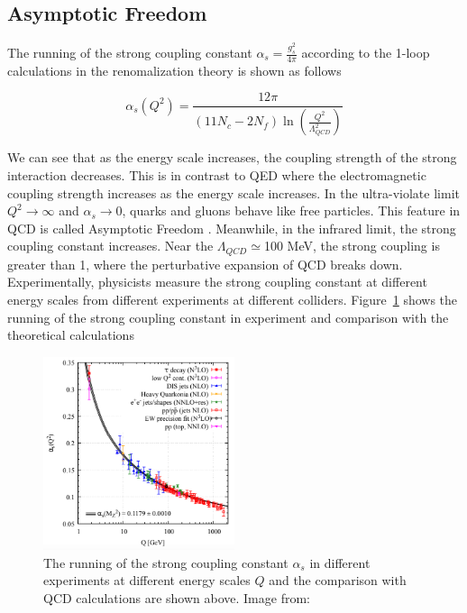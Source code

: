 \subsection{Asymptotic Freedom}

The running of the strong coupling constant $\alpha_s = \frac{g_s^2}{4\pi}$ according to the 1-loop calculations in the renomalization theory \cite{QCDRunning} is shown as follows

\begin{equation}
\alpha_{s} (Q^2) = \frac{12\pi}{(11 N_{c} - 2 N_{f}) \ln(\frac{Q^2}{\Lambda_{QCD}^2})}
\end{equation}

We can see that as the energy scale increases, the coupling strength of the strong interaction decreases. This is in contrast to QED where the electromagnetic coupling strength increases as the energy scale increases. In the ultra-violate limit $Q^2 \rightarrow \infty$ and $\alpha_{s} \rightarrow 0$, quarks and gluons behave like free particles. This feature in QCD is called Asymptotic Freedom \cite{QCDAsym}. Meanwhile, in the infrared limit, the strong coupling constant increases. Near the $\Lambda_{QCD} \simeq$100 MeV, the strong coupling is greater than 1, where the perturbative expansion of QCD breaks down. Experimentally, physicists measure the strong coupling constant at different energy scales from different experiments at different colliders. Figure~\ref{QCDCoupling} \cite{AlphaTheoEx} shows the running of the strong coupling constant in experiment and comparison with the theoretical calculations 

\begin{figure}[hbtp]
\begin{center}
\includegraphics[width=0.50\textwidth]{Figures/Chapter1/QCDCoupling.png}
\caption{The running of the strong coupling constant $\alpha_s$ in different experiments at different energy scales $Q$ and the comparison with QCD calculations are shown above. Image from: \cite{AlphaTheoEx}}
\label{QCDCoupling}
\end{center}
\end{figure} 


